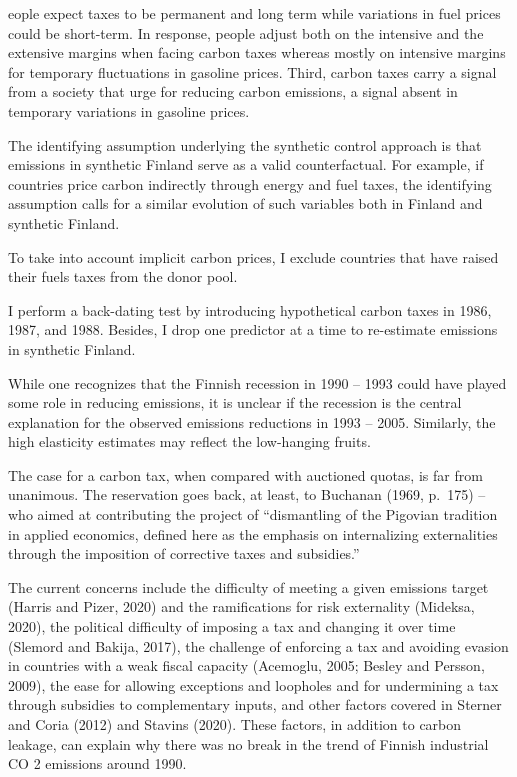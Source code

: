 \documentclass[
]{book}
\begin{document}
eople expect taxes to be
permanent and long term while variations in fuel prices could be short-term. In
response, people adjust both on the intensive and the extensive margins when facing
carbon taxes whereas mostly on intensive margins for temporary fluctuations in gasoline
prices. Third, carbon taxes carry a signal from a society that urge for reducing carbon
emissions, a signal absent in temporary variations in gasoline prices.

The identifying assumption underlying the synthetic control approach is that emissions in
synthetic Finland serve as a valid counterfactual. For example, if countries price carbon
indirectly through energy and fuel taxes, the identifying assumption calls for a similar
evolution of such variables both in Finland and synthetic Finland.

To take into account implicit carbon prices, I exclude countries that have raised their
fuels taxes from the donor pool.

I perform a back-dating test by introducing
hypothetical carbon taxes in 1986, 1987, and 1988. Besides, I drop one predictor at a
time to re-estimate emissions in synthetic Finland.

While
one recognizes that the Finnish recession in 1990 -- 1993 could have played some role in
reducing emissions, it is unclear if the recession is the central explanation for the observed
emissions reductions in 1993 -- 2005. Similarly, the high elasticity estimates may reflect
the low-hanging fruits.

The case for a carbon tax, when compared with auctioned quotas, is far from
unanimous.
The reservation goes back, at least, to Buchanan (1969, p.~175) -- who
aimed at contributing the project of ``dismantling of the Pigovian tradition in applied
economics, defined here as the emphasis on internalizing externalities through the
imposition of corrective taxes and subsidies.''

The current concerns include the difficulty
of meeting a given emissions target (Harris and Pizer, 2020) and the ramifications for
risk externality (Mideksa, 2020), the political difficulty of imposing a tax and changing
it over time (Slemord and Bakija, 2017), the challenge of enforcing a tax and avoiding
evasion in countries with a weak fiscal capacity (Acemoglu, 2005; Besley and Persson,
2009), the ease for allowing exceptions and loopholes and for undermining a tax through
subsidies to complementary inputs, and other factors covered in Sterner and Coria
(2012) and Stavins (2020). These factors, in addition to carbon leakage, can explain why
there was no break in the trend of Finnish industrial CO 2 emissions around 1990.
\end{document}
